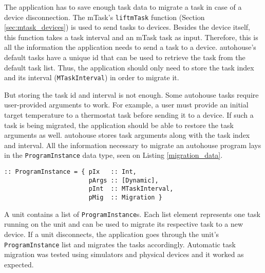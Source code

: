 The application has to save enough task data to migrate a task in case of a device disconnection. The \gls{mTask}'s \texttt{liftmTask} function (Section \ref{sec:mtask_devices}) is used to send tasks to devices. Besides the device itself, this function takes a task interval and an \gls{mTask} task as input. Therefore, this is all the information the application needs to send a task to a device. \gls{autohouse}'s default tasks have a unique id that can be used to retrieve the task from the default task list. Thus, the application should only need to store the task index and its interval (\texttt{MTaskInterval}) in order to migrate it. 

But storing the task id and interval is not enough. Some \gls{autohouse} tasks require user-provided arguments to work. For example, a user must provide an initial target temperature to a thermostat task before sending it to a device. If such a task is being migrated, the application should be able to restore the task arguments as well. \gls{autohouse} stores task arguments along with the task index and interval. All the information necessary to migrate an \gls{autohouse} program lays in the \texttt{ProgramInstance} data type, seen on Listing \ref{migration_data}.

\begin{lstlisting}[caption=Task migration data,captionpos=b,label=migration_data]
:: ProgramInstance = { pIx   :: Int,
                       pArgs :: [Dynamic],
                       pInt  :: MTaskInterval,
                       pMig  :: Migration }
\end{lstlisting}

A unit contains a list of \texttt{ProgramInstance}s. Each list element represents one task running on the unit and can be used to migrate its respective task to a new device. If a unit disconnects, the application goes through the unit's \texttt{ProgramInstance} list and migrates the tasks accordingly. Automatic task migration was tested using simulators and physical devices and it worked as expected.